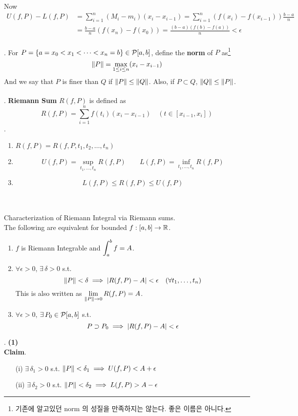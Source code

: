 Now 
$$\begin{aligned}
	U(f, P) - L(f, P) &= \sum_{i=1}^n (M_i-m_i)(x_i - x_{i-1})  = \sum_{i=1}^n (f(x_i) - f(x_{i-1})) \frac{b-a}{n}\\
	&=\frac{b-a}{n} (f(x_n)-f(x_0)) = \frac{(b-a)(f(b)-f(a))}{n} < \epsilon
\end{aligned}$$
\\
. For $P = \{a = x_0 < x_1 < \cdots < x_n = b \}\in \mathcal{P}[a, b]$, define the \textbf{norm} of $P$ as\footnote{기존에 알고있던 norm 의 성질을 만족하지는 않는다. 좋은 이름은 아니다.}
$$\left\lVert P\right\rVert = \max_{1\leq i \leq n} (x_i - x_{i-1})$$
And we say that $P$ is finer than $Q$ if $\left\lVert P\right\rVert \leq \left\lVert Q\right\rVert$. Also, if $P\subset Q$, $\left\lVert Q\right\rVert\leq \left\lVert P\right\rVert$.\\
\\
. \textbf{Riemann Sum} $R(f, P)$ is defined as
$$R(f, P) = \sum_{i=1}^n f(t_i)(x_i-x_{i-1}) \quad (t\in [x_{i-1}, x_i])$$
\rmk. 
\begin{enumerate}
	\item $R(f, P) = R(f, P, t_1, t_2, \dots, t_n)$
	\item $$U(f, P) = \sup_{t_1, \dots, t_n} R(f, P)
	\qquad L(f, P) = \inf_{t_1, \dots, t_n} R(f, P)$$
	\item $$L(f, P) \leq R(f, P) \leq U(f, P)$$
\end{enumerate}~
\\
\\
 Characterization of Riemann Integral via Riemann sums.\\
The following are equivalent for bounded $f:[a, b]\rightarrow \mathbb{R}$.
\begin{enumerate}
	\item $f$ is Riemann Integrable and $\displaystyle \int_a^b f = A$.
	\item $\forall \epsilon > 0$, $\exists\,\delta >0$ s.t. $$\left\lVert P\right\rVert < \delta \implies \left|R(f, P)-A\right| < \epsilon \quad (\forall t_1, \dots, t_n)$$
	This is also written as $\displaystyle \lim_{\left\lVert P\right\rVert\rightarrow0} R(f, P) = A$.
	\item $\forall\epsilon> 0$, $\exists\, P_0\in\mathcal{P}[a, b]$ s.t.
	$$P\supset P_0 \implies \left|R(f, P) - A\right|  < \epsilon$$
\end{enumerate}
\pf. \textbf{(1)}\\
\textbf{Claim}. 
\begin{enumerate}
	\item[(i)] $\exists\,\delta_1 > 0$ s.t. $\left\lVert P\right\rVert < \delta_1 \implies U(f, P) < A + \epsilon$
	\item[(ii)] $\exists\,\delta_2 > 0$ s.t. $\left\lVert P\right\rVert < \delta_2 \implies L(f, P) > A - \epsilon$
\end{enumerate}
